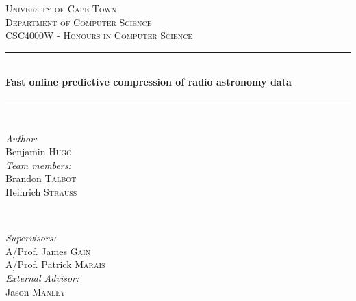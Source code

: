 
\begin{titlepage}
\newcommand{\HRule}{\rule{\linewidth}{0.5mm}} %

\center %
 

\textsc{\LARGE University of Cape Town}\\[1.5cm] %
\textsc{\Large Department of Computer Science}\\[0.5cm] %
\textsc{\large CSC4000W - Honours in Computer Science}\\[0.5cm] %


\HRule \\[0.6cm]
{ \huge \bfseries Fast online predictive compression of radio astronomy data}\\[0.4cm] %
\HRule \\[0.4cm]
 

\begin{minipage}{0.4\textwidth}
\begin{flushleft} \large
\emph{Author:}\\
Benjamin \textsc{Hugo}\footnotemark\\ %
\vspace{10pt}
\emph{Team members:}\\
Brandon \textsc{Talbot}\\ 
Heinrich \textsc{Strauss} 
\end{flushleft}
\end{minipage}
~
\begin{minipage}{0.4\textwidth}
\begin{flushright} \large
\emph{Supervisors:} \\
A/Prof. James \textsc{Gain}\\ %
A/Prof. Patrick \textsc{Marais}\\
\vspace{10pt}
\emph{External Advisor:} \\
Jason \textsc{Manley}
\end{flushright}
\end{minipage}\\[1.4cm]


\end{titlepage}
